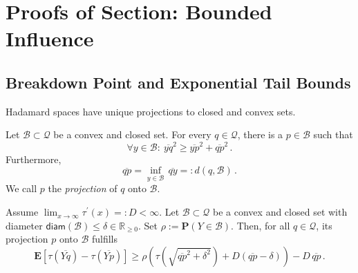 \documentclass{article}
\newcommand*{\mc}[1]{\mathcal{#1}}
\newcommand{\R}{\mathbb{R}}
\newcommand{\Rp}{\R_{\geq0}}
\newcommand{\lab}{\left[} %
\newcommand{\rab}{\right]} %
\newcommand{\ab}[1]{\lab #1 \rab} %
\newcommand{\abOf}[1]{\!\ab{#1}} %
\newcommand{\lb}{\left(} %
\newcommand{\rb}{\right)} %
\newcommand{\br}[1]{\lb #1 \rb} %
\newcommand{\brOf}[1]{\!\br{#1}} %
\renewcommand{\Pr}{\mathbf{P}} %
\newcommand{\Prof}[1]{\Pr(#1)}
\newcommand{\E}{\mathbf{E}} %
\newcommand{\EOf}[1]{\E\abOf{#1}}
\newcommand{\pr}{^\prime}
\newcommand{\eqfs}{\,.}
\newcommand{\ol}[2]{\overline{#1#2}}
\newcommand{\tran}{\tau}
\newcommand{\dtran}{\tau\pr}
\newcommand{\diam}{\mathsf{diam}}
\begin{document}
\section{Proofs of Section: Bounded Influence}

\subsection{Breakdown Point and Exponential Tail Bounds}
%
Hadamard spaces have unique projections to closed and convex sets.
%
\begin{proposition}\label{prp:projection}
    Let $\mc B \subset \mc Q$ be a convex and closed set. For every $q \in \mc Q$, there is a $p \in \mc B$ such that
    \begin{equation}
        \forall y\in\mc B\colon\ \ol yq^2 \geq \ol yp^2 + \ol qp^2
        \eqfs 
    \end{equation}
    Furthermore,
    \begin{equation}
        \ol qp = \inf_{y \in \mc B} \,\ol qy =: d(q, \mc B)
        \eqfs
    \end{equation}
    We call $p$ the \emph{projection} of $q$ onto $\mc B$.
\end{proposition}
%
\begin{lemma}\label{lmm:finiteD:convex:lower}
    Assume $\lim_{x\to\infty}\dtran(x) =: D < \infty$.
    Let $\mc B \subset \mc Q$ be a convex and closed set with diameter $\diam(\mc B) \leq \delta \in\Rp$. Set $\rho := \Prof{Y \in \mc B}$.
    Then, for all $q \in \mc Q$, its projection $p$ onto $\mc B$ fulfills
    \begin{equation}
        \EOf{\tran(\ol Yq) - \tran(\ol Yp)} \geq \rho \br{\tran\brOf{\sqrt{\ol qp^2 + \delta^2}} + D (\ol qp - \delta)} - D\, \ol qp
        \eqfs
    \end{equation}
\end{lemma}
%
\end{document}
